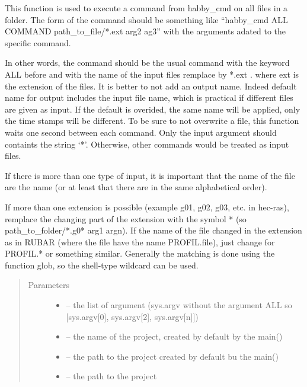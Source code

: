 \documentclass[letterpaper,10pt,english]{sphinxmanual}
\begin{document}

\begin{fulllineitems}
\label{\detokenize{index:src.func_for_cmd.habby_on_all}}
This function is used to execute a command from habby\_cmd on all files in a folder. The form of the command should
be something like ``habby\_cmd ALL COMMAND path\_to\_file/*.ext arg2 ag3'' with the arguments adated to the specific
command.

In other words, the command should be the usual command with the keyword ALL before and with the name of
the input files remplace by *.ext . where ext is the extension of the files.
It is better to not add an output name. Indeed default name for output includes the input file name, which
is practical if different files are given as input. If the default
is overided, the same name will be applied, only the time stamps will be different. To be sure to not overwrite a
file, this function waits one second between each command. Only the input argument should containts the string `*'.
Otherwise, other commands would be treated as input files.

If there is more than one type of input, it is important that the name of the file are the name (or at least
that there are in the same alphabetical order).

If more than one extension is possible (example g01, g02, g03, etc. in hec-ras), remplace the changing part of the
extension with the symbol * (so path\_to\_folder/*.g0* arg1 argn). If the name of the file changed in the extension
as in RUBAR (where the file have the name PROFIL.file), just change for PROFIL.* or something similar. Generally
the matching is done using the function glob, so the shell-type wildcard can be used.
\begin{quote}\begin{description}
\item[{Parameters}] \leavevmode\begin{itemize}
\item {} 
 -- the list of argument (sys.argv without the argument ALL so {[}sys.argv{[}0{]}, sys.argv{[}2{]}, sys.argv{[}n{]}{]})

\item {} 
 -- the name of the project, created by default by the main()

\item {} 
 -- the path to the project created by default bu the main()

\item {} 
 -- the path to the project

\end{itemize}

\end{description}\end{quote}

\end{fulllineitems}
\end{document}
